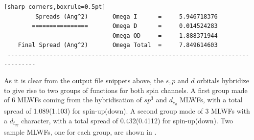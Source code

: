 \begin{enumerate}
\begin{tcolorbox}
{\begin{verbatim}[sharp corners,boxrule=0.5pt]
         Spreads (Ang^2)       Omega I      =     5.946718376
        ================       Omega D      =     0.014524283
                               Omega OD     =     1.888371944
    Final Spread (Ang^2)       Omega Total  =     7.849614603
 ------------------------------------------------------------------------------
	\end{verbatim}
	}
	\end{tcolorbox}
	As it is clear from the output file snippets above, the $s,p$ and $d$ orbitals hybridize to give rise to two groups of functions for both spin channels. A first group made of 6 MLWFs coming from the hybridisation of $sp^3$ and $d_{e_g}$ MLWFs, with a total spread of 1.089(1.103)\angsqd{} for spin-up(down). A second group made of 3 MLWFs with a $d_{t_{2g}}$ character, with a total spread of 0.432(0.4112)\angsqd{} for spin-up(down). Two sample MLWFs, one for each group, are shown in .
	\end{enumerate}

